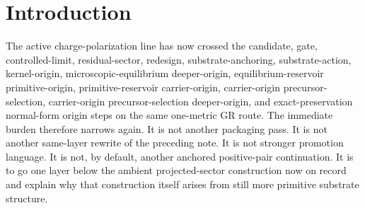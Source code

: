 \documentclass[11pt]{article}
\newcommand{\DeepFunctional}{\mathscr F_{\mathrm{deep}}}
\newcommand{\ProtoFunctional}{\mathscr F_{\mathrm{proto}}}
\newcommand{\DeepTensor}{\mathfrak X}
\newcommand{\DeepRelabel}{\mathfrak J}
\newcommand{\DeepFree}{\mathfrak W}
\newcommand{\ProtoTensor}{\mathfrak Y}
\newcommand{\ProtoRelabel}{\mathfrak K}
\newcommand{\ProtoFree}{\mathfrak Z}
\begin{document}
\begin{abstract}
Eliminating the microphysical defect layer reproduces exactly the same ambient exact-preservation functional
\[
\ProtoFunctional[\ProtoTensor,\ProtoRelabel,\ProtoFree]
\]
already recorded one layer above. The previously recorded ambient elimination then reproduces exactly the same exact-preservation normal form
\[
\DeepFunctional[\DeepTensor,\DeepRelabel,\DeepFree],
\]
and the already recorded downstream eliminations again reproduce exactly the same carrier-origin functional, the same primitive reservoir, the same microscopic-equilibrium reservoir, the same \(\Pi_{\mathrm{free}}H=0\) outcome, the same substrate and observer completion solves, and the same one operative metric. In particular, the same carrier-origin functional yields the same primitive reservoir, the same microscopic-equilibrium completion reservoir, the same completion solve \(\Sigma^{\mathrm{cmp}}\), and the same observer-equation closure.

The scope remains disciplined. This note does not claim a final ultraviolet completion or a uniqueness theorem for every conceivable more primitive substrate sector. Its positive claim is narrower and exact: at the current quadratic exact-preservation scope, the ambient projected-sector construction itself is recovered as the defect-null exact-preserving sector of a still more primitive microphysical layer with coercively gapped defect directions, while preserving the same downstream one-metric completion package.
\end{abstract}

\section{Introduction}

The active charge-polarization line has now crossed the candidate, gate, controlled-limit, residual-sector, redesign, substrate-anchoring, substrate-action, kernel-origin, microscopic-equilibrium deeper-origin, equilibrium-reservoir primitive-origin, primitive-reservoir carrier-origin, carrier-origin precursor-selection, carrier-origin precursor-selection deeper-origin, and exact-preservation normal-form origin steps on the same one-metric GR route. The immediate burden therefore narrows again. It is not another packaging pass. It is not another same-layer rewrite of the preceding note. It is not stronger promotion language. It is not, by default, another anchored positive-pair continuation. It is to go one layer below the ambient projected-sector construction now on record and explain why that construction itself arises from still more primitive substrate structure.
\end{document}
